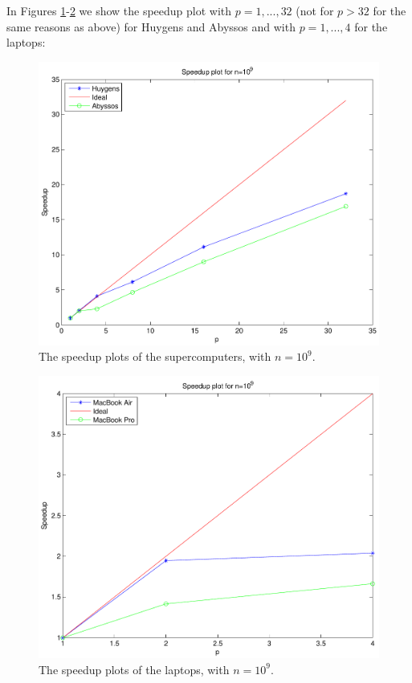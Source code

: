 \documentclass[a4paper,11pt]{article}
\begin{document}
In Figures \ref{sp1e9}-\ref{sp1e9m} we show the speedup plot with $p=1,...,32$ (not for $p>32$ for the same reasons as above) for Huygens and Abyssos and with $p=1,...,4$ for the laptops:

\begin{figure}[H]
\begin{center}
\includegraphics[scale=0.6]{img/sp1e9}
\end{center}
\caption{The speedup plots of the supercomputers, with $n=10^9$.} \label{sp1e9}
\end{figure}

\begin{figure}[H]
\begin{center}
\includegraphics[scale=0.6]{img/sp1e9m}
\end{center}
\caption{The speedup plots of the laptops, with $n=10^9$.} \label{sp1e9m}
\end{figure}
\end{document}
